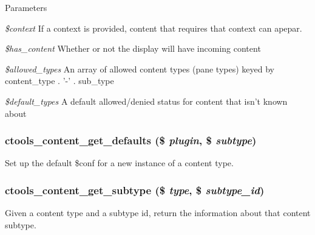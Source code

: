\begin{DoxyParams}{Parameters}
\item[{\em \$context}]If a context is provided, content that requires that context can apepar. \item[{\em \$has\_\-content}]Whether or not the display will have incoming content \item[{\em \$allowed\_\-types}]An array of allowed content types (pane types) keyed by content\_\-type . '-\/' . sub\_\-type \item[{\em \$default\_\-types}]A default allowed/denied status for content that isn't known about \end{DoxyParams}
\hypertarget{content_8inc_a528e74fc0b05f44ec27dfc2604f645d5}{
\subsubsection[{ctools\_\-content\_\-get\_\-defaults}]{\setlength{\rightskip}{0pt plus 5cm}ctools\_\-content\_\-get\_\-defaults (\$ {\em plugin}, \/  \$ {\em subtype})}}
\label{content_8inc_a528e74fc0b05f44ec27dfc2604f645d5}
Set up the default \$conf for a new instance of a content type. \hypertarget{content_8inc_a097e7d6c457337992167d8fffbffeb2a}{
\subsubsection[{ctools\_\-content\_\-get\_\-subtype}]{\setlength{\rightskip}{0pt plus 5cm}ctools\_\-content\_\-get\_\-subtype (\$ {\em type}, \/  \$ {\em subtype\_\-id})}}
\label{content_8inc_a097e7d6c457337992167d8fffbffeb2a}
Given a content type and a subtype id, return the information about that content subtype.


